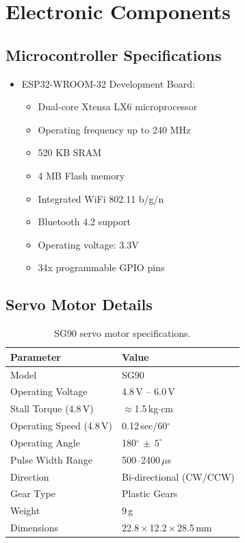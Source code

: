 \documentclass[12pt,a4paper]{report}
\begin{document}
\section{Electronic Components}
\subsection{Microcontroller Specifications}
\begin{itemize}
\item ESP32-WROOM-32 Development Board:
\begin{itemize}
\item Dual-core Xtensa LX6 microprocessor
\item Operating frequency up to 240 MHz
\item 520 KB SRAM
\item 4 MB Flash memory
\item Integrated WiFi 802.11 b/g/n
\item Bluetooth 4.2 support
\item Operating voltage: 3.3V
\item 34x programmable GPIO pins
\end{itemize}
\end{itemize}
\subsection{Servo Motor Details}
\begin{table}[H]
\centering
\begin{tabular}{|l|l|}
\hline
\textbf{Parameter} & \textbf{Value} \\
\hline
Model & SG90 \\
Operating Voltage & 4.8\,V -- 6.0\,V \\
Stall Torque (4.8\,V) & $\approx$1.5\,kg$\cdot$cm \\
Operating Speed (4.8\,V) & 0.12\,sec/60$^{\circ}$ \\
Operating Angle & 180$^{\circ}\,\pm\,5^{\circ}$ \\
Pulse Width Range & 500--2400\,$\mu$s \\
Direction & Bi-directional (CW/CCW) \\
Gear Type & Plastic Gears \\
Weight & 9\,g \\
Dimensions & 22.8\,$\times$\,12.2\,$\times$\,28.5\,mm \\
\hline
\end{tabular}
\caption{SG90 servo motor specifications.}
\end{table}
\end{document}
